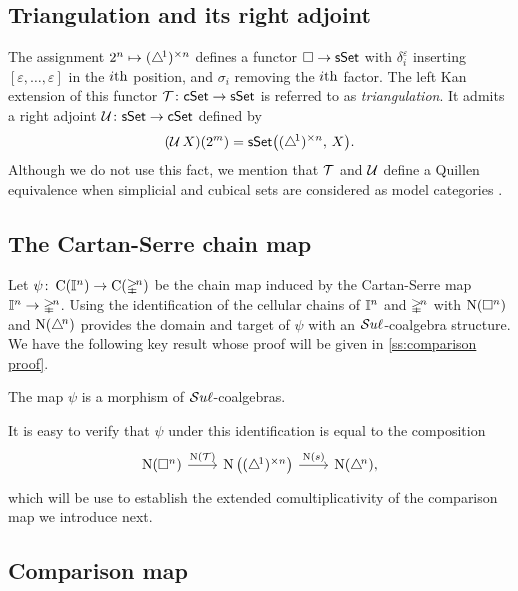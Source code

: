 \subsection{Triangulation and its right adjoint} \label{triangulation and its right adjoint}

The assignment $2^n \mapsto (\triangle^{\!1})^{\times n}$ defines a functor $\square \to \mathsf{sSet}$ with $\delta_i^\varepsilon$ inserting $[\varepsilon, \dots, \varepsilon]$ in the $i\mathrm{th}$ position, and $\sigma_i$ removing the $i\mathrm{th}$ factor.
The left Kan extension of this functor $\operatorname{\mathcal{T}} \colon \mathsf{cSet} \to \mathsf{sSet}$ is referred to as \textit{triangulation}.
It admits a right adjoint $\operatorname{\mathcal{U}} \colon \mathsf{sSet} \to \mathsf{cSet}$ defined by
\[
(\operatorname{\mathcal{U}} X)(2^m) = \mathsf{sSet} \big( (\triangle^{\!1})^{\times n}, \, X \big).
\]
Although we do not use this fact, we mention that $\operatorname{\mathcal{T}}$ and $\operatorname{\mathcal{U}}$ define a Quillen equivalence when simplicial and cubical sets are considered as model categories \cite[8.4.30]{cisinski2006presheaves}.

\subsection{The Cartan-Serre chain map} \label{ss:the cartan-serre chain map}

Let $\psi \colon \operatorname{C}(\mathbb{I}^n) \to \operatorname{C}(\mathbb{\Delta}^{\!n})$ be the chain map induced by the Cartan-Serre map $\mathbb{I}^n \to \mathbb{\Delta}^{\!n}$.
Using the identification of the cellular chains of $\mathbb{I}^n$ and $\mathbb{\Delta}^{\!n}$ with $\operatorname{N}(\square^n)$ and $\operatorname{N}(\triangle^{\!n})$
provides the domain and target of $\psi$ with an $\mathcal{S}u\ell$-coalgebra structure.
We have the following key result whose proof will be given in  \cref{ss:comparison proof}.

\begin{lemma} \label{l:cartan-serre is e infinity}
	The map $\psi$ is a morphism of $\mathcal{S}u\ell$-coalgebras.
\end{lemma}

It is easy to verify that $\psi$ under this identification is equal to the composition
\[
\begin{tikzcd}[column sep=normal]
\chains(\cube^n) \arrow[r, "\chains(\T)"] &[-3pt]
\chains \big( \scube{n} \big) \arrow[r, "\chains(s)"] &[-3pt]
\chains(\simplex^{\!n}),
\end{tikzcd}
\]
which will be use to establish the extended comultiplicativity of the comparison map we introduce next.

\subsection{Comparison map} \label{ss:comparison map}

